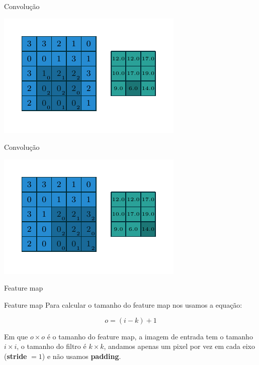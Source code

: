 \documentclass[10pt]{beamer}
\begin{document}
\begin{frame}{Convolução}
\begin{center}
\includegraphics[scale=1.5]{images/numerical_no_padding_no_strides_07.pdf}
\end{center}
\end{frame}

\begin{frame}{Convolução}
\begin{center}
\includegraphics[scale=1.5]{images/numerical_no_padding_no_strides_08.pdf}
\end{center}
\end{frame}

\begin{frame}{Feature map}

\end{frame}


\begin{frame}{Feature map}
Para calcular o tamanho do feature map nos usamos a equação:

\begin{equation*}
 o = (i - k) +1
\end{equation*}


Em que $o \times o$ é o tamanho do feature map, a imagem de entrada tem o tamanho $i \times i$, o tamanho do filtro é $k \times k$, andamos apenas um pixel por vez em cada eixo (\textbf{stride} $= 1$) e não usamos \textbf{padding}.
\end{frame}
\end{document}
